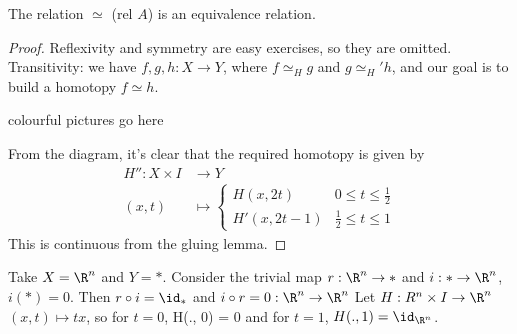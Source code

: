 \documentclass{article}
\numberwithin{nthm}{subsection}
\begin{document}


\begin{nprop}
    The relation $\simeq$  (rel $A$) is an equivalence relation.
\end{nprop}

\begin{proof}
    Reflexivity and symmetry are easy exercises, so they are omitted.  Transitivity: we have $f, g, h: X \to Y$, where $f \simeq_H g$ and $g \simeq_H' h$, and our goal is to build a homotopy $f \simeq h$.

    colourful pictures go here

    From the diagram, it's clear that the required homotopy is given by
    \begin{align*}
        H'' : X \times I &\to Y \\
        (x, t) &\mapsto
        \begin{cases}
            H(x, 2t) & 0 \leq t \leq \frac12 \\
            H'(x, 2t-1) & \frac12 \leq t \leq 1
        \end{cases}
    \end{align*}
    This is continuous from the gluing lemma.
\end{proof}


\begin{eg}
    Take $X = \R^n$ and $Y = *$. Consider the trivial map $r: \R^n \to *$ and $i: * \to \R^n$, $i(*) = 0$. Then $r \circ i = \id_*$ and $i \circ r = 0: \R^n \to \R^n$
    Let $H: R^n \times I \to \R^n$ $(x, t) \mapsto tx$, so for $t=0$, H(., 0) = 0 and for $t=1$, $H(., 1) = \id_{\R^n}$.
\end{eg}
\end{document}
